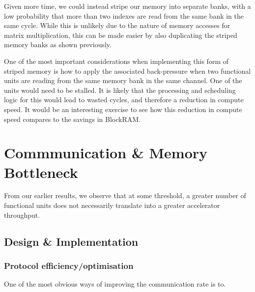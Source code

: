 \documentclass[a4paper,8pt]{report}
\begin{document}


Given more time, we could instead stripe our memory into separate banks, with a
low probability that more than two indexes are read from the same bank in the
same cycle. While this is unlikely due to the nature of memory accesses for matrix
multiplication, this can be made easier by also duplicating the striped memory
banks as shown previously.


One of the most important considerations when implementing this form of striped
memory is how to apply the associated back-pressure when two functional units
are reading from the same memory bank in the same channel. One of the units
would need to be stalled. It is likely that the processing and scheduling logic
for this would lead to wasted cycles, and therefore a reduction in compute
speed. It would be an interesting exercise to see how this reduction in compute
speed compares to the savings in BlockRAM.




\chapter{Commmunication \& Memory Bottleneck}
From our earlier results, we observe that at some threshold, a greater number of
functional units does not necessarily translate into a greater accelerator
throughput. 

\section{Design \& Implementation}
\subsection{Protocol efficiency/optimisation}
One of the most obvious ways of improving the communication rate is to.


\end{document}
